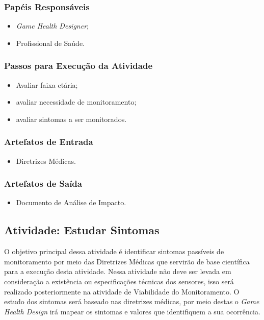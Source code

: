 \subsubsection{Papéis Responsáveis}
\begin{itemize}
	\item \textit{Game Health Designer};
	\item Profissional de Saúde.
\end{itemize}

\subsubsection{Passos para Execução da Atividade}
\begin{itemize}
	\item Avaliar faixa etária;
	\item avaliar necessidade de monitoramento;
	\item avaliar sintomas a ser monitorados.
\end{itemize}

\subsubsection{Artefatos de Entrada}
\begin{itemize}
	\item Diretrizes Médicas.
\end{itemize}

\subsubsection{Artefatos de Saída}
\begin{itemize}
	\item Documento de Análise de Impacto.
\end{itemize}


\subsection{Atividade: Estudar Sintomas}
O objetivo principal dessa atividade é identificar sintomas passíveis de monitoramento por meio das Diretrizes Médicas que servirão de base científica para a execução desta atividade. Nessa atividade não deve ser levada em consideração a existência ou especificações técnicas dos sensores, isso será realizado posteriormente na atividade de Viabilidade do Monitoramento. O estudo dos sintomas será baseado nas diretrizes médicas, por meio destas o \textit{Game Health Design} irá mapear os sintomas e valores que identifiquem a sua ocorrência.

